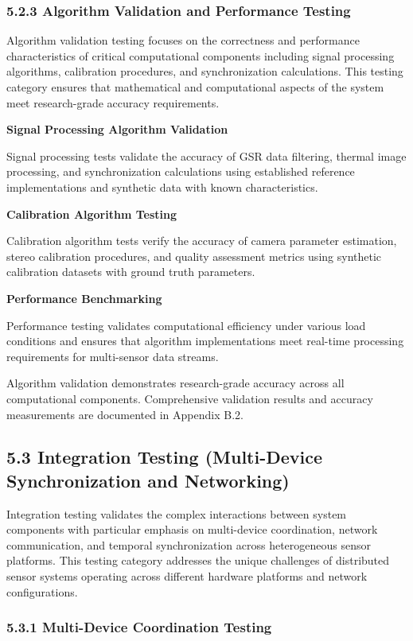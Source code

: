 \documentclass[12pt,a4paper]{article}
\begin{document}
\subsubsection{5.2.3 Algorithm Validation and Performance Testing}

Algorithm validation testing focuses on the correctness and performance characteristics of critical computational
components including signal processing algorithms, calibration procedures, and synchronization calculations. This
testing category ensures that mathematical and computational aspects of the system meet research-grade accuracy
requirements.

\textbf{Signal Processing Algorithm Validation}

Signal processing tests validate the accuracy of GSR data filtering, thermal image processing, and synchronization
calculations using established reference implementations and synthetic data with known characteristics.

\textbf{Calibration Algorithm Testing}

Calibration algorithm tests verify the accuracy of camera parameter estimation, stereo calibration procedures, and
quality assessment metrics using synthetic calibration datasets with ground truth parameters.

\textbf{Performance Benchmarking}

Performance testing validates computational efficiency under various load conditions and ensures that algorithm
implementations meet real-time processing requirements for multi-sensor data streams.

Algorithm validation demonstrates research-grade accuracy across all computational components. Comprehensive validation
results and accuracy measurements are documented in Appendix B.2.

\subsection{5.3 Integration Testing (Multi-Device Synchronization and Networking)}

Integration testing validates the complex interactions between system components with particular emphasis on
multi-device coordination, network communication, and temporal synchronization across heterogeneous sensor platforms.
This testing category addresses the unique challenges of distributed sensor systems operating across different hardware
platforms and network configurations.

\subsubsection{5.3.1 Multi-Device Coordination Testing}
\end{document}
